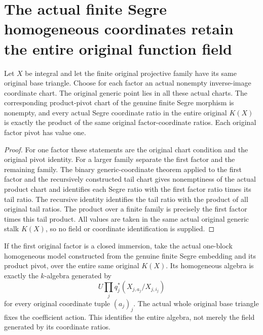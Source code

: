 \section{The actual finite Segre homogeneous coordinates retain the entire original function field}
\label{sec:finite-segre-native-coordinate-algebra}
\begin{theorem}
\label{thm:finite-segre-native-coordinate-product}
\leanok
{}
Let $X$ be integral and let the finite original projective family have its
same original base triangle. Choose for each factor an actual nonempty
inverse-image coordinate chart. The original generic point lies in all
these actual charts. The corresponding product-pivot chart of the genuine
finite Segre morphism is nonempty, and every actual Segre coordinate
ratio in the entire original $K(X)$ is exactly the product of the same
original factor-coordinate ratios. Each original factor pivot has value one.
\end{theorem}
\begin{proof}
For one factor these statements are the original chart condition and the
original pivot identity. For a larger family separate the first factor
and the remaining family. The binary generic-coordinate theorem applied
to the first factor and the recursively constructed tail chart gives
nonemptiness of the actual product chart and identifies each Segre ratio
with the first factor ratio times its tail ratio. The recursive identity
identifies the tail ratio with the product of all original tail ratios.
The product over a finite family is precisely the first factor times
this tail product. All values are taken in the same actual original
generic stalk $K(X)$, so no field or coordinate identification is supplied.
\end{proof}
\begin{theorem}
\label{thm:finite-segre-native-coordinate-algebra}
\leanok
{}
If the first original factor is a closed immersion, take the actual
one-block homogeneous model constructed from the genuine finite Segre
embedding and its product pivot, over the entire same original $K(X)$.
Its homogeneous algebra is exactly the $k$-algebra generated by
\[
 U\prod_jq_j^*(X_{j,a_j}/X_{j,i_j})
\]
for every original coordinate tuple $(a_j)_j$. The actual whole original
base triangle fixes the coefficient action. This identifies the entire
algebra, not merely the field generated by its coordinate ratios.
\end{theorem}
